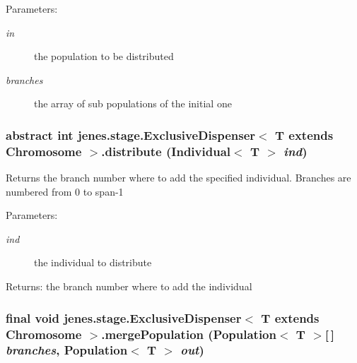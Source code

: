 \begin{Desc}
\item[Parameters:]
\begin{description}
\item[{\em in}]the population to be distributed \item[{\em branches}]the array of sub populations of the initial one \end{description}
\end{Desc}
\hypertarget{classjenes_1_1stage_1_1_exclusive_dispenser_3_01_t_01extends_01_chromosome_01_4_706558b075a61b04099decf44729c870}{
\subsubsection[distribute]{\setlength{\rightskip}{0pt plus 5cm}abstract int jenes.stage.ExclusiveDispenser$<$ T extends Chromosome $>$.distribute (Individual$<$ T $>$ {\em ind})}}
\label{classjenes_1_1stage_1_1_exclusive_dispenser_3_01_t_01extends_01_chromosome_01_4_706558b075a61b04099decf44729c870}


Returns the branch number where to add the specified individual. Branches are numbered from 0 to span-1

\begin{Desc}
\item[Parameters:]
\begin{description}
\item[{\em ind}]the individual to distribute \end{description}
\end{Desc}
\begin{Desc}
\item[Returns:]the branch number where to add the individual \end{Desc}
\hypertarget{classjenes_1_1stage_1_1_exclusive_dispenser_3_01_t_01extends_01_chromosome_01_4_1179e92bbe9a4942b9097d9846c01801}{
\subsubsection[mergePopulation]{\setlength{\rightskip}{0pt plus 5cm}final void jenes.stage.ExclusiveDispenser$<$ T extends Chromosome $>$.mergePopulation (Population$<$ T $>$\mbox{[}$\,$\mbox{]} {\em branches}, \/  Population$<$ T $>$ {\em out})}}
\label{classjenes_1_1stage_1_1_exclusive_dispenser_3_01_t_01extends_01_chromosome_01_4_1179e92bbe9a4942b9097d9846c01801}


